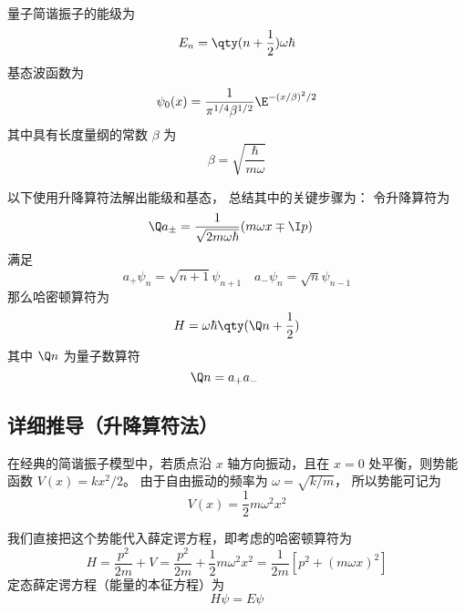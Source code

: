 
\begin{issues}
\issueAbstract
\end{issues}



量子简谐振子的能级为
\begin{equation}
E_n = \qty(n+\frac12)\omega \hbar
\end{equation}
基态波函数为
\begin{equation}
\psi_0 (x) = \frac{1}{\pi^{1/4} \beta^{1/2}} \E^{-(x/\beta)^2/2}
\end{equation}
其中具有长度量纲的常数 $\beta$ 为
\begin{equation}
\beta  = \sqrt{\frac{\hbar}{m\omega}}
\end{equation}

以下使用升降算符法解出能级和基态， 总结其中的关键步骤为： 令升降算符为
\begin{equation}
\Q a_\pm = \frac{1}{\sqrt{2m\omega\hbar}} (m\omega x \mp \I p) \quad
\end{equation}
满足
\begin{equation}
a_+ \psi_n = \sqrt{n + 1} \psi_{n+1}
\quad
a_- \psi_n = \sqrt n \psi_{n-1}
\end{equation}
那么哈密顿算符为
\begin{equation}
H = \omega\hbar \qty(\Q n + \frac12)
\end{equation}
其中 $\Q n$ 为量子数算符
\begin{equation}
\Q n = a_+ a_ - \qquad
\end{equation}

\subsection{详细推导（升降算符法）}

在经典的简谐振子模型中，若质点沿 $x$ 轴方向振动，且在 $x = 0$ 处平衡，则势能函数 $V(x) = k x^2/2$。 由于自由振动的频率为 $\omega = \sqrt{k/m}$， 所以势能可记为
\begin{equation}
V(x) = \frac12 m \omega^2 x^2
\end{equation}

我们直接把这个势能代入薛定谔方程，即考虑的哈密顿算符为
\begin{equation}
H = \frac{p^2}{2m} + V = \frac{p^2}{2m} + \frac12 m\omega^2 x^2 = \frac{1}{2m} [p^2 + (m\omega x)^2]
\end{equation}
定态薛定谔方程（能量的本征方程）为
\begin{equation}\label{QSHOop_eq6}
H\psi  = E\psi
\end{equation}


